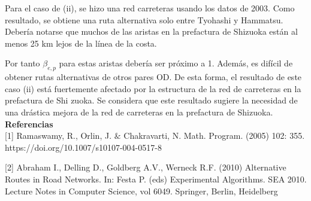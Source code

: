 \documentclass[10pt]{report}
\begin{document}
Para el caso de (ii), se hizo una red carreteras usando los datos de 2003.  Como resultado, se obtiene una ruta alternativa solo entre Tyohashi y Hammatsu.
Debería notarse que muchos de las aristas en la prefactura de Shizuoka están al menos 25 km lejos de la línea de la costa.

Por tanto $\beta_{e,p}$ para estas aristas debería ser próximo a 1.
Además, es difícil de obtener rutas alternativas de otros pares OD. De esta forma, el resultado de este caso (ii)  está fuertemente afectado por la estructura de la red de carreteras en la prefactura de Shi zuoka. Se considera que este resultado sugiere la necesidad de una drástica mejora de la red de carreteras en la prefactura de Shizuoka.\\

\textbf{Referencias}\\

[1] Ramaswamy, R., Orlin, J. $\&$ Chakravarti, N. Math. Program. (2005) 102: 355. https://doi.org/10.1007/s10107-004-0517-8

[2] Abraham I., Delling D., Goldberg A.V., Werneck R.F. (2010) Alternative Routes in Road Networks. In: Festa P. (eds) Experimental Algorithms. SEA 2010. Lecture Notes in Computer Science, vol 6049. Springer, Berlin, Heidelberg
\end{document}
